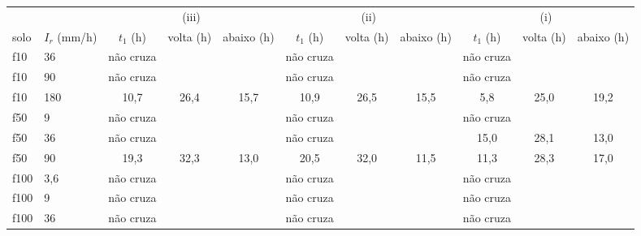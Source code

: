 \begin{tabular}{llccccccccc}
\toprule
 & & \multicolumn{3}{c}{(iii)} & \multicolumn{3}{c}{(ii)} & \multicolumn{3}{c}{(i)}\\
\cmidrule(lr){3-5}\cmidrule(lr){6-8}\cmidrule(lr){9-11}
solo & $I_r$ (mm/h) & $t_1$ (h) & volta (h) & abaixo (h) & $t_1$ (h) & volta (h) & abaixo (h) & $t_1$ (h) & volta (h) & abaixo (h)\\
\midrule
f10 & 36 & não cruza &  &  & não cruza &  &  & não cruza &  & \\
f10 & 90 & não cruza &  &  & não cruza &  &  & não cruza &  & \\
f10 & 180 & 10{,}7 & 26{,}4 & 15{,}7 & 10{,}9 & 26{,}5 & 15{,}5 & 5{,}8 & 25{,}0 & 19{,}2\\
\midrule
f50 & 9 & não cruza &  &  & não cruza &  &  & não cruza &  & \\
f50 & 36 & não cruza &  &  & não cruza &  &  & 15{,}0 & 28{,}1 & 13{,}0\\
f50 & 90 & 19{,}3 & 32{,}3 & 13{,}0 & 20{,}5 & 32{,}0 & 11{,}5 & 11{,}3 & 28{,}3 & 17{,}0\\
\midrule
f100 & 3{,}6 & não cruza &  &  & não cruza &  &  & não cruza &  & \\
f100 & 9 & não cruza &  &  & não cruza &  &  & não cruza &  & \\
f100 & 36 & não cruza &  &  & não cruza &  &  & não cruza &  & \\
\bottomrule
\end{tabular}
